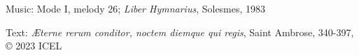


\begin{hymnsource}
Music: Mode I, melody 26; \emph{Liber Hymnarius}, Solesmes, 1983

Text: \emph{Æterne rerum conditor, noctem diemque qui regis}, Saint Ambrose, 340-397, © 2023 ICEL
\end{hymnsource}
